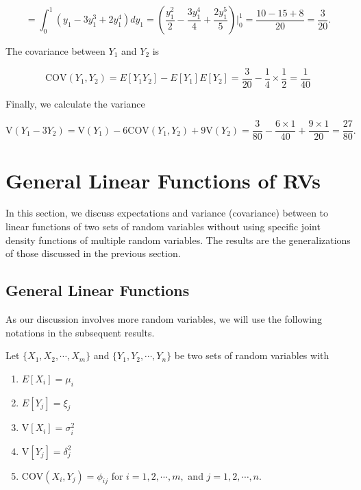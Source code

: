 \documentclass[
]{book}
\begin{document}
\[
=\int_0^1 (y_1-3y_1^3+2y_1^4)dy_1 = \left(\frac{y_1^2}{2} -\frac{3y_1^4}{4} + \frac{2y_1^5}{5} \right)\Bigg|_0^1 = \frac{10-15+8}{20} = \frac{3}{20}.
\]

The covariance between \(Y_1\) and \(Y_2\) is

\[
\text{COV}(Y_1, Y_2) = E[Y_1Y_2]-E[Y_1]E[Y_2] = \frac{3}{20} - \frac{1}{4}\times \frac{1}{2} = \frac{1}{40}
\]

Finally, we calculate the variance

\[
\text{V}(Y_1-3Y_2) = \text{V}(Y_1) -6\text{COV}(Y_1,Y_2) + 9\text{V}(Y_2) = \frac{3}{80}-\frac{6\times 1}{40} + \frac{9\times 1}{20} = \frac{27}{80}.
\]

\hypertarget{general-linear-functions-of-rvs}{%
\section{General Linear Functions of RVs}\label{general-linear-functions-of-rvs}}

In this section, we discuss expectations and variance (covariance) between to linear functions of two sets of random variables without using specific joint density functions of multiple random variables. The results are the generalizations of those discussed in the previous section.

\hypertarget{general-linear-functions}{%
\subsection{General Linear Functions}\label{general-linear-functions}}

As our discussion involves more random variables, we will use the following notations in the subsequent results.

Let \(\{X_1, X_2, \cdots, X_m \}\) and \(\{Y_1, Y_2, \cdots, Y_n \}\) be two sets of random variables with

\begin{enumerate}
\def\labelenumi{\arabic{enumi}.}
\item
  \(E[X_i] = \mu_i\)
\item
  \(E[Y_j]=\xi_j\)
\item
  \(\text{V}[X_i] = \sigma_i^2\)
\item
  \(\text{V}[Y_j] = \delta_j^2\)
\item
  \(\text{COV}(X_i, Y_j) = \phi_{ij}\) for \(i = 1, 2, \cdots, m,\) and \(j=1,2,\cdots, n\).
\end{enumerate}
\end{document}
